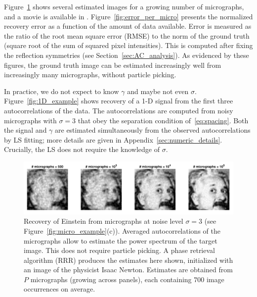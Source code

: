 \documentclass[9pt,twocolumn,twoside,lineno]{pnas-new}
\begin{document}
Figure~\ref{fig:Einst_example} shows several estimated images for a growing number of micrographs, and a movie is available in . Figure~\ref{fig:error_per_micro} presents the normalized recovery error as a function of the amount of data available. Error is measured as the ratio of the root mean square error (RMSE) to the norm of the ground truth (square root of the sum of squared pixel intensities). This is computed after fixing the reflection symmetries (see Section~\ref{sec:AC_analysis}). As evidenced by these figures, the ground truth image can be estimated increasingly well from increasingly many micrographs, without particle picking.

In practice, we do not expect to know $\gamma$ and maybe not even $\sigma$.
Figure~\ref{fig:1D_example} shows recovery of a 1-D signal from the first three autocorrelations of the data.
The autocorrelations are computed from noisy micrographs with $\sigma=3$ that obey the separation condition of~\eqref{eq:spacing}.
 Both the signal  and $\gamma$ are estimated simultaneously from the observed autocorrelations by LS fitting; more details are given in Appendix~\ref{sec:numeric_details}. Crucially, the LS does not require the knowledge of $\sigma$. 


\begin{figure}[h!]
	\centering
	\includegraphics[scale=0.7]{Einstein_progress_examples}
	\caption{\label{fig:Einst_example} Recovery of Einstein from micrographs at noise level $\sigma = 3$ (see Figure~\ref{fig:micro_example}(c)). Averaged autocorrelations of the micrographs allow to estimate the power spectrum of the target image. This does not require particle picking. A phase retrieval algorithm (RRR) produces the estimates here shown, initialized with an image of the physicist Isaac Newton. Estimates are obtained from $P$ micrographs (growing across panels), each containing $700$ image occurrences on average.
	}
\end{figure}
\end{document}
